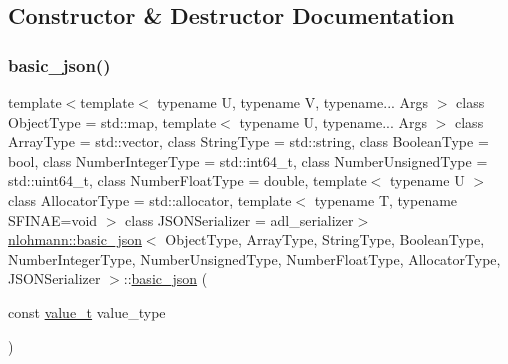 \subsection{Constructor \& Destructor Documentation}
\mbox{\label{classnlohmann_1_1basic__json_a32124a16dc80729d964d9caf607c2bc8}} 
\subsubsection{\texorpdfstring{basic\_json()}{basic\_json()}\hspace{0.1cm}{\footnotesize\ttfamily [1/9]}}
{\footnotesize\ttfamily template$<$template$<$ typename U, typename V, typename... Args $>$ class Object\+Type = std\+::map, template$<$ typename U, typename... Args $>$ class Array\+Type = std\+::vector, class String\+Type  = std\+::string, class Boolean\+Type  = bool, class Number\+Integer\+Type  = std\+::int64\+\_\+t, class Number\+Unsigned\+Type  = std\+::uint64\+\_\+t, class Number\+Float\+Type  = double, template$<$ typename U $>$ class Allocator\+Type = std\+::allocator, template$<$ typename T, typename S\+F\+I\+N\+A\+E=void $>$ class J\+S\+O\+N\+Serializer = adl\+\_\+serializer$>$ \\
\mbox{\hyperlink{classnlohmann_1_1basic__json}{nlohmann\+::basic\+\_\+json}}$<$ Object\+Type, Array\+Type, String\+Type, Boolean\+Type, Number\+Integer\+Type, Number\+Unsigned\+Type, Number\+Float\+Type, Allocator\+Type, J\+S\+O\+N\+Serializer $>$\+::\mbox{\hyperlink{classnlohmann_1_1basic__json}{basic\+\_\+json}} (\begin{DoxyParamCaption}\item[{const \mbox{\hyperlink{namespacenlohmann_1_1detail_a90aa5ef615aa8305e9ea20d8a947980f}{value\+\_\+t}}}]{value\+\_\+type }\end{DoxyParamCaption})\hspace{0.3cm}{\ttfamily [inline]}}



